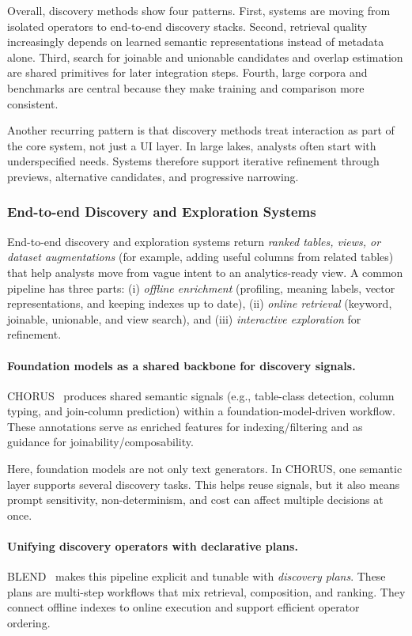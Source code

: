 \documentclass[sigconf,nonacm]{acmart}
\begin{document}
Overall, discovery methods show four patterns. First, systems are moving from isolated operators to end-to-end discovery stacks. Second, retrieval quality increasingly depends on learned semantic representations instead of metadata alone. Third, search for joinable and unionable candidates and overlap estimation are shared primitives for later integration steps. Fourth, large corpora and benchmarks are central because they make training and comparison more consistent.

Another recurring pattern is that discovery methods treat interaction as part of the core system, not just a UI layer. In large lakes, analysts often start with underspecified needs. Systems therefore support iterative refinement through previews, alternative candidates, and progressive narrowing.

\subsubsection{End-to-end Discovery and Exploration Systems}
End-to-end discovery and exploration systems return \emph{ranked tables, views, or dataset augmentations} (for example, adding useful columns from related tables) that help analysts move from vague intent to an analytics-ready view. A common pipeline has three parts: (i) \emph{offline enrichment} (profiling, meaning labels, vector representations, and keeping indexes up to date), (ii) \emph{online retrieval} (keyword, joinable, unionable, and view search), and (iii) \emph{interactive exploration} for refinement.

\paragraph{Foundation models as a shared backbone for discovery signals.}
CHORUS~\cite{10.14778/3659437.3659461} produces shared semantic signals (e.g., table-class detection, column typing, and join-column prediction) within a foundation-model-driven workflow. These annotations serve as enriched features for indexing/filtering and as guidance for joinability/composability.

Here, foundation models are not only text generators. In CHORUS, one semantic layer supports several discovery tasks. This helps reuse signals, but it also means prompt sensitivity, non-determinism, and cost can affect multiple decisions at once.

\paragraph{Unifying discovery operators with declarative plans.}
BLEND~\cite{11112882} makes this pipeline explicit and tunable with \emph{discovery plans}. These plans are multi-step workflows that mix retrieval, composition, and ranking. They connect offline indexes to online execution and support efficient operator ordering.
\end{document}
